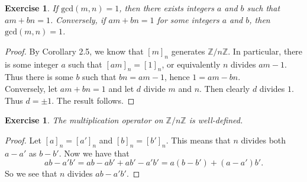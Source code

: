 \documentclass[a4paper, 11pt]{book}
\theoremstyle{plain}
\newtheorem{exercise}[theorem]{Exercise}
\theoremstyle{plain}
\begin{document}
\begin{exercise}
If $\text{gcd}(m,n)=1$, then there exists integers $a$ and $b$ such that $am+bn=1$. Conversely, if $am+bn=1$ for some integers $a$ and $b$, then $\text{gcd}(m,n)=1$.
\end{exercise}
\begin{proof}
By Corollary 2.5, we know that $[m]_n$ generates $\mathbb{Z}/n\mathbb{Z}$. In particular, there is some integer $a$ such that $[am]_n=[1]_n$, or equivalently $n$ divides $am-1$. Thus there is some $b$ such that $bn=am-1$, hence $1=am-bn$.\\
Conversely, let $am+bn=1$ and let $d$ divide $m$ and $n$. Then clearly $d$ divides $1$. Thus $d=\pm 1$. The result follows.
\end{proof}

\begin{exercise}
The multiplication operator on $\mathbb{Z}/n\mathbb{Z}$ is well-defined.
\end{exercise}
\begin{proof}
Let $[a]_n=[a']_n$ and $[b]_n=[b']_n$. This means that $n$ divides both $a-a'$ as $b-b'$. Now we have that
$$ab-a'b' = ab - ab' + ab' - a'b' = a(b-b') + (a-a')b'.$$
So we see that $n$ divides $ab-a'b'$.
\end{proof}
\end{document}
